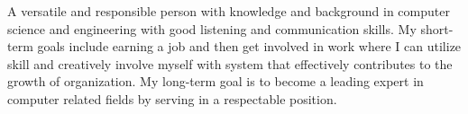 

\begin{cvparagraph}

A versatile and responsible person with knowledge and background in computer science and engineering with good listening and communication skills. My short-term goals include earning a job and then get involved in work where I can utilize skill and creatively involve myself with system that effectively contributes to the growth of organization. My long-term goal is to become a leading expert in computer related fields by serving in a respectable position.
\end{cvparagraph}